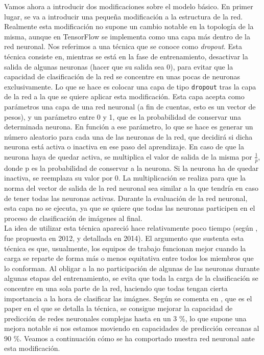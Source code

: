 \documentclass[11pt]{article}
\theoremstyle{plain}
\theoremstyle{definition}
\begin{document}
Vamos ahora a introducir dos modificaciones sobre el modelo básico. En
primer lugar, se va a introducir una pequeña modificación a la
estructura de la red. Realmente esta modificación no supone un cambio
notable en la topología de la misma, aunque en TensorFlow se
implementa como una capa más dentro de la red neuronal. Nos referimos
a una técnica que se conoce como \textit{dropout}. Esta técnica
consiste en, mientras se está en la fase de entrenamiento, desactivar
la salida de algunas neuronas (hacer que su salida sea 0), para evitar
que la capacidad de clasificación de la red se concentre en unas pocas
de neuronas exclusivamente. Lo que se hace es colocar una capa de tipo
\texttt{dropout} tras la capa de la red a la que se quiere aplicar
esta modificación. Esta capa acepta como parámetros una capa de una
red neuronal (a fin de cuentas, esto es un vector de pesos), y un
parámetro entre 0 y 1, que es la probabilidad de conservar una
determinada neurona. En función a ese parámetro, lo que se hace es
generar un número aleatorio para cada una de las neuronas de la red,
que decidirá si dicha neurona está activa o inactiva en ese paso del
aprendizaje. En caso de que la neurona haya de quedar activa, se
multiplica el valor de salida de la misma por $\frac{1}{p}$, donde p
es la probabilidad de conservar a la neurona. Si la neurona ha de
quedar inactiva, se reemplaza su valor por 0. La multiplicación se
realiza para que la norma del vector de salida de la red neuronal sea
similar a la que tendría en caso de tener todas las neuronas
activas. Durante la evaluación de la red neuronal, esta capa no se
ejecuta, ya que se quiere que todas las neuronas participen
en el proceso de clasificación de imágenes al final.\\

La idea de utilizar esta técnica apareció hace relativamente poco
tiempo (según \cite{book-tf}, fue propuesta en 2012, y detallada en
2014). El argumento que sustenta esta técnica es que, usualmente, los
equipos de trabajo funcionan mejor cuando la carga se reparte de forma
más o menos equitativa entre todos los miembros que lo conforman. Al
obligar a la no participación de algunas de las neuronas durante
algunas etapas del entrenamiento, se evita que toda la carga de la
clasificación se concentre en una sola parte de la red, haciendo que
todas tengan cierta importancia a la hora de clasificar las imágnes.
Según se comenta en \cite{Srivastava:2014:DSW:2627435.2670313}, que es
el paper en el que se detalla la técnica, se consigue mejorar la capacidad
de predicción de redes neuronales complejas hasta en un 3 \%, lo que
supone una mejora notable si nos estamos moviendo en capacidades de
predicción cercanas al 90 \%. Veamos a continuación cómo se ha comportado
nuestra red neuronal ante esta modificación.
\end{document}
